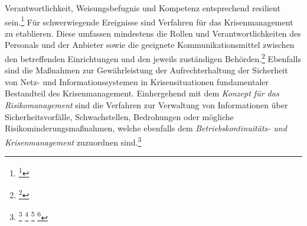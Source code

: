 \documentclass[11pt,a4paper,hidelinks]{article}   %
\begin{document}
Verantwortlichkeit, Weisungsbefugnis und Kompetenz entsprechend resilient sein.\footnote{\footcite[Vgl.][, Anhang, Nummer 4.2.4.]{EU2024-2690}} Für schwerwiegende Ereignisse sind Verfahren für das Krisenmanagement zu etablieren. Diese umfassen mindestens die Rollen und Verantwortlichkeiten des Personals und der Anbieter sowie die geeignete Kommunikationsmittel zwischen den betreffenden Einrichtungen und den jeweils zuständigen Behörden.\footnote{\footcite[Vgl.][, Anhang, Nummer 4.3.1. \& 4.3.2.]{EU2024-2690}} Ebenfalls sind die Maßnahmen zur Gewährleistung der Aufrechterhaltung der Sicherheit von Netz- und Informationssystemen in Krisensituationen fundamentaler Bestandteil des Krisenmanagement. Einhergehend mit dem \emph{Konzept für das Risikomanagement} sind die Verfahren zur Verwaltung von Informationen über Sicherheitsvorfälle, Schwachstellen, Bedrohungen oder mögliche Risikominderungsmaßnahmen, welche ebenfalls dem \emph{Betriebskontinuitäts- und Krisenmanagement} zuzuordnen sind.\footnote{
                \footcite[Vgl.][, Anhang, Nummer 4]{EU2024-2690}
                \footcite[Vgl.][, Anhang, Nummer 4.3.3.]{EU2024-2690}
                \footcite[Vgl.][Artikel 22, Absatz 1]{EU2022-2555}
                \footcite[Vgl.][§30 Absatz 2, Nummer 3]{NIS2UmsuCG}
            }

\end{document}
